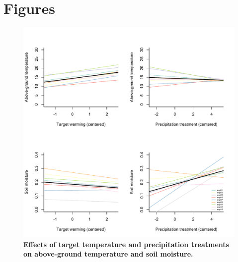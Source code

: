 \documentclass{article}
\begin{document}
\clearpage
\section* {Figures}
\clearpage
 \begin{figure}[h]
\centering
 \includegraphics{../../Analyses/soilmoisture/figures/smtempvstargtemppreciptreat_lineslmerALL.pdf}
 \caption{\textbf{Effects of target temperature and precipitation treatments on above-ground temperature and soil moisture.}} 
 \label{fig:soilmois}
 \end{figure}
\end{document}
